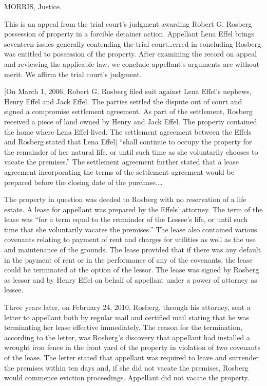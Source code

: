 
\textsc{MORRIS}, Justice.

This is an appeal from the trial court's judgment awarding Robert G. Rosberg
possession of property in a forcible detainer action. Appellant Lena Effel
brings seventeen issues generally contending the trial court\ldots  erred in
concluding Rosberg was entitled to possession of the property. After examining
the record on appeal and reviewing the applicable law, we conclude appellant's
arguments are without merit. We affirm the trial court's judgment.


[On March 1, 2006, Robert G. Rosberg filed suit against Lena Effel's nephews,
Henry Effel and Jack Effel. The parties settled the dispute out of court and
signed a compromise settlement agreement. As part of the settlement, Rosberg
received a piece of land owned by Henry and Jack Effel.  The property contained
the home where Lena Effel lived. The settlement agreement between the Effels
and Rosberg stated that Lena Effel] ``shall continue to occupy the property for
the remainder of her natural life, or until such time as she voluntarily
chooses to vacate the premises.'' The settlement agreement further stated that
a lease agreement incorporating the terms of the settlement agreement would be
prepared before the closing date of the purchase.\ldots

The property in question was deeded to Rosberg with no reservation of a life
estate. A lease for appellant was prepared by the Effels' attorney. The term of
the lease was ``for a term equal to the remainder of the Lessee's life, or
until such time that she voluntarily vacates the premises.'' The lease also
contained various covenants relating to payment of rent and charges for
utilities as well as the use and maintenance of the grounds. The lease provided
that if there was any default in the payment of rent or in the performance of
any of the covenants, the lease could be terminated at the option of the
lessor. The lease was signed by Rosberg as lessor and by Henry Effel on behalf
of appellant under a power of attorney as lessee.

Three years later, on February 24, 2010, Rosberg, through his attorney, sent a
letter to appellant both by regular mail and certified mail stating that he was
terminating her lease effective immediately. The reason for the termination,
according to the letter, was Rosberg's discovery that appellant had installed a
wrought iron fence in the front yard of the property in violation of two
covenants of the lease. The letter stated that appellant was required to leave
and surrender the premises within ten days and, if she did not vacate the
premises, Rosberg would commence eviction proceedings. Appellant did not vacate
the property.

